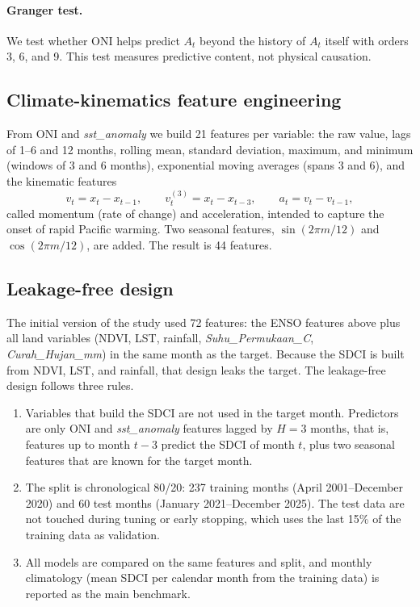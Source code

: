 \documentclass[11pt,twoside]{article}
\begin{document}
\paragraph{Granger test.} We test whether ONI helps predict $A_t$ beyond the history of $A_t$ itself \cite{granger1969causality} with orders 3, 6, and 9. This test measures predictive content, not physical causation.

\subsection{Climate-kinematics feature engineering}
\label{SubSec:Features}

From ONI and \textit{sst\_anomaly} we build 21 features per variable: the raw value, lags of 1--6 and 12 months, rolling mean, standard deviation, maximum, and minimum (windows of 3 and 6 months), exponential moving averages (spans 3 and 6), and the kinematic features
\begin{equation}
v_t = x_t - x_{t-1}, \qquad v^{(3)}_t = x_t - x_{t-3}, \qquad a_t = v_t - v_{t-1},
\label{Eq:Kinematic}
\end{equation}
called momentum (rate of change) and acceleration, intended to capture the onset of rapid Pacific warming. Two seasonal features, $\sin(2\pi m/12)$ and $\cos(2\pi m/12)$, are added. The result is 44 features.

\subsection{Leakage-free design}
\label{SubSec:Leakfree}

The initial version of the study used 72 features: the ENSO features above plus all land variables (NDVI, LST, rainfall, \textit{Suhu\_Permukaan\_C}, \textit{Curah\_Hujan\_mm}) in the same month as the target. Because the SDCI is built from NDVI, LST, and rainfall, that design leaks the target. The leakage-free design follows three rules.
\begin{enumerate}
\item Variables that build the SDCI are not used in the target month. Predictors are only ONI and \textit{sst\_anomaly} features lagged by $H = 3$ months, that is, features up to month $t - 3$ predict the SDCI of month $t$, plus two seasonal features that are known for the target month.
\item The split is chronological 80/20: 237 training months (April 2001--December 2020) and 60 test months (January 2021--December 2025). The test data are not touched during tuning or early stopping, which uses the last 15\% of the training data as validation.
\item All models are compared on the same features and split, and monthly climatology (mean SDCI per calendar month from the training data) is reported as the main benchmark.
\end{enumerate}
\end{document}
